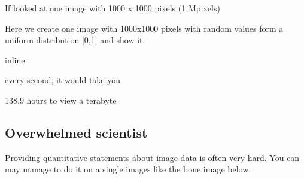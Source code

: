 \documentclass[letterpaper,10pt,english]{sphinxmanual}
\begin{document}
\sphinxAtStartPar
If  looked at one image with 1000 x 1000 pixels (1 Mpixels)

\sphinxAtStartPar
Here we create one image with 1000x1000 pixels with random values form a uniform distribution {[}0,1{]} and show it.

\begin{sphinxVerbatim}[commandchars=\\\{\}]
 inline
   
   

    
             
\end{sphinxVerbatim}

\noindent{}

\sphinxAtStartPar
every second, it would take you

\begin{sphinxVerbatim}[commandchars=\\\{\}]
      
  
       

  
\end{sphinxVerbatim}

\begin{sphinxVerbatim}[commandchars=\\\{\}]
138.9 hours to view a terabyte
\end{sphinxVerbatim}


\subsection{Overwhelmed scientist}
\label{\detokenize{01-Introduction:overwhelmed-scientist}}
\sphinxAtStartPar
Providing quantitative statements about image data is often very hard. You can may manage to do it on a single images like the bone image below.
\end{document}

